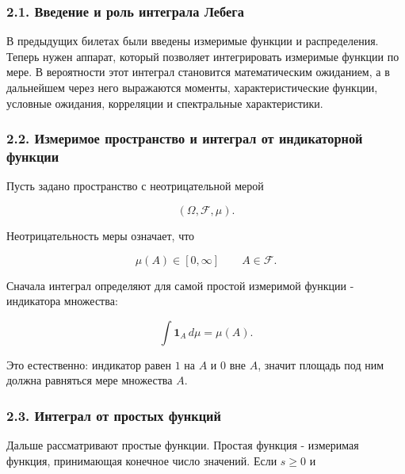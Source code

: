 \documentclass[
  11pt,
  a4paper,
]{article}
\begin{document}
\subsubsection{2.1. Введение и роль интеграла
Лебега}\label{ux432ux432ux435ux434ux435ux43dux438ux435-ux438-ux440ux43eux43bux44c-ux438ux43dux442ux435ux433ux440ux430ux43bux430-ux43bux435ux431ux435ux433ux430}

В предыдущих билетах были введены измеримые функции и распределения.
Теперь нужен аппарат, который позволяет интегрировать измеримые функции
по мере. В вероятности этот интеграл становится математическим
ожиданием, а в дальнейшем через него выражаются моменты,
характеристические функции, условные ожидания, корреляции и спектральные
характеристики.

\subsubsection{2.2. Измеримое пространство и интеграл от индикаторной
функции}\label{ux438ux437ux43cux435ux440ux438ux43cux43eux435-ux43fux440ux43eux441ux442ux440ux430ux43dux441ux442ux432ux43e-ux438-ux438ux43dux442ux435ux433ux440ux430ux43b-ux43eux442-ux438ux43dux434ux438ux43aux430ux442ux43eux440ux43dux43eux439-ux444ux443ux43dux43aux446ux438ux438}

Пусть задано пространство с неотрицательной мерой

\[
(\Omega,\mathcal F,\mu).
\]

Неотрицательность меры означает, что

\[
\mu(A)\in[0,\infty]
\qquad
A\in\mathcal F.
\]

Сначала интеграл определяют для самой простой измеримой функции -
индикатора множества:

\[
\int \mathbf 1_A\,d\mu=\mu(A).
\]

Это естественно: индикатор равен \(1\) на \(A\) и \(0\) вне \(A\),
значит площадь под ним должна равняться мере множества \(A\).

\subsubsection{2.3. Интеграл от простых
функций}\label{ux438ux43dux442ux435ux433ux440ux430ux43b-ux43eux442-ux43fux440ux43eux441ux442ux44bux445-ux444ux443ux43dux43aux446ux438ux439}

Дальше рассматривают простые функции. Простая функция - измеримая
функция, принимающая конечное число значений. Если \(s\ge0\) и
\end{document}

